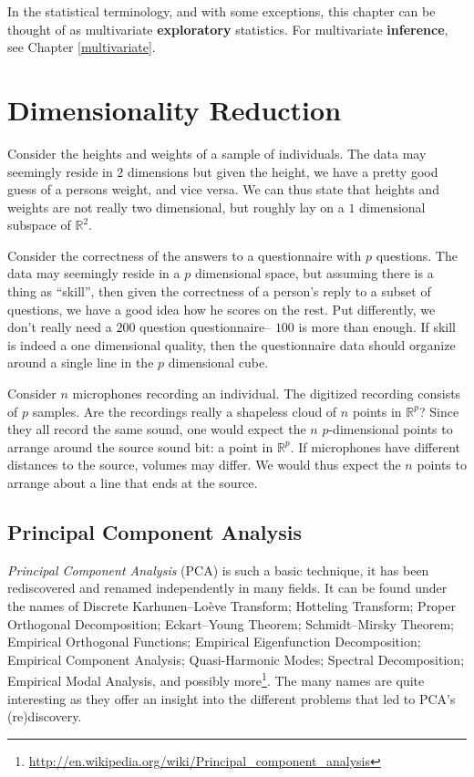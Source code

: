 \documentclass[]{book}
\theoremstyle{definition}
\theoremstyle{definition}
\theoremstyle{remark}
\let\BeginKnitrBlock\begin \let\EndKnitrBlock\end
\begin{document}
In the statistical terminology, and with some exceptions, this chapter
can be thought of as multivariate \textbf{exploratory} statistics. For
multivariate \textbf{inference}, see Chapter \ref{multivariate}.

\section{Dimensionality Reduction}\label{dim-reduce}

\BeginKnitrBlock{example}
\protect\hypertarget{ex:bmi}{}{\label{ex:bmi}}Consider the heights and
weights of a sample of individuals. The data may seemingly reside in
\(2\) dimensions but given the height, we have a pretty good guess of a
persons weight, and vice versa. We can thus state that heights and
weights are not really two dimensional, but roughly lay on a \(1\)
dimensional subspace of \(\mathbb{R}^2\).
\EndKnitrBlock{example}

\BeginKnitrBlock{example}
\protect\hypertarget{ex:iq}{}{\label{ex:iq}}Consider the correctness of the
answers to a questionnaire with \(p\) questions. The data may seemingly
reside in a \(p\) dimensional space, but assuming there is a thing as
``skill'', then given the correctness of a person's reply to a subset of
questions, we have a good idea how he scores on the rest. Put
differently, we don't really need a \(200\) question questionnaire--
\(100\) is more than enough. If skill is indeed a one dimensional
quality, then the questionnaire data should organize around a single
line in the \(p\) dimensional cube.
\EndKnitrBlock{example}

\BeginKnitrBlock{example}
\protect\hypertarget{ex:blind-signal}{}{\label{ex:blind-signal}}Consider
\(n\) microphones recording an individual. The digitized recording
consists of \(p\) samples. Are the recordings really a shapeless cloud
of \(n\) points in \(\mathbb{R}^p\)? Since they all record the same
sound, one would expect the \(n\) \(p\)-dimensional points to arrange
around the source sound bit: a point in \(\mathbb{R}^p\). If microphones
have different distances to the source, volumes may differ. We would
thus expect the \(n\) points to arrange about a line that ends at the
source.
\EndKnitrBlock{example}

\subsection{Principal Component Analysis}\label{pca}

\emph{Principal Component Analysis} (PCA) is such a basic technique, it
has been rediscovered and renamed independently in many fields. It can
be found under the names of Discrete Karhunen--Loève Transform;
Hotteling Transform; Proper Orthogonal Decomposition; Eckart--Young
Theorem; Schmidt--Mirsky Theorem; Empirical Orthogonal Functions;
Empirical Eigenfunction Decomposition; Empirical Component Analysis;
Quasi-Harmonic Modes; Spectral Decomposition; Empirical Modal Analysis,
and possibly more\footnote{\url{http://en.wikipedia.org/wiki/Principal_component_analysis}}.
The many names are quite interesting as they offer an insight into the
different problems that led to PCA's (re)discovery.
\end{document}
